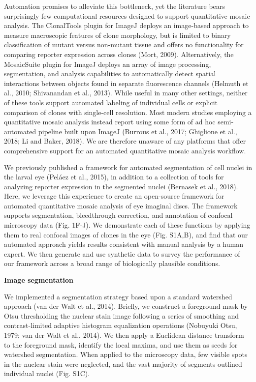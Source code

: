 Automation promises to alleviate this bottleneck, yet the literature bears surprisingly few computational resources designed to support quantitative mosaic analysis. The ClonalTools plugin for ImageJ deploys an image-based approach to measure macroscopic features of clone morphology, but is limited to binary classification of mutant versus non-mutant tissue and offers no functionality for comparing reporter expression across clones (Mort, 2009). Alternatively, the MosaicSuite plugin for ImageJ deploys an array of image processing, segmentation, and analysis capabilities to automatically detect spatial interactions between objects found in separate fluorescence channels (Helmuth et al., 2010; Shivanandan et al., 2013). While useful in many other settings, neither of these tools support automated labeling of individual cells or explicit comparison of clones with single-cell resolution. Most modern studies employing a quantitative mosaic analysis instead report using some form of ad hoc semi-automated pipeline built upon ImageJ (Burrous et al., 2017; Ghiglione et al., 2018; Li and Baker, 2018). We are therefore unaware of any platforms that offer comprehensive support for an automated quantitative mosaic analysis workflow.

We previously published a framework for automated segmentation of cell nuclei in the larval eye (Peláez et al., 2015), in addition to a collection of tools for analyzing reporter expression in the segmented nuclei (Bernasek et al., 2018). Here, we leverage this experience to create an open-source framework for automated quantitative mosaic analysis of eye imaginal discs. The framework supports segmentation, bleedthrough correction, and annotation of confocal microscopy data (Fig. 1F-J). We demonstrate each of these functions by applying them to real confocal images of clones in the eye (Fig. S1A,B), and find that our automated approach yields results consistent with manual analysis by a human expert. We then generate and use synthetic data to survey the performance of our framework across a broad range of biologically plausible conditions.

\textbf{Image segmentation}

We implemented a segmentation strategy based upon a standard watershed approach (van der Walt et al., 2014). Briefly, we construct a foreground mask by Otsu thresholding the nuclear stain image following a series of smoothing and contrast-limited adaptive histogram equalization operations (Nobuyuki Otsu, 1979; van der Walt et al., 2014). We then apply a Euclidean distance transform to the foreground mask, identify the local maxima, and use them as seeds for watershed segmentation. When applied to the microscopy data, few visible spots in the nuclear stain were neglected, and the vast majority of segments outlined individual nuclei (Fig. S1C).

